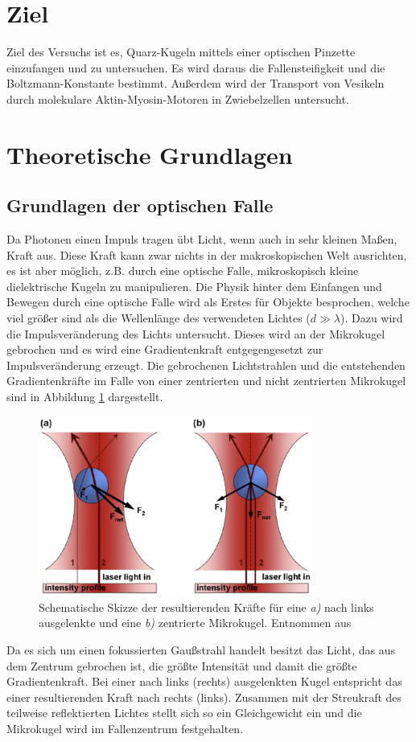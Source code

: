 \section{Ziel}
  Ziel des Versuchs ist es, Quarz-Kugeln mittels einer optischen Pinzette einzufangen und zu untersuchen. Es wird daraus die Fallensteifigkeit und die Boltzmann-Konstante bestimmt. Außerdem wird der Transport von Vesikeln durch molekulare Aktin-Myosin-Motoren in Zwiebelzellen untersucht.
\section{Theoretische Grundlagen}
  \subsection{Grundlagen der optischen Falle}
    Da Photonen einen Impuls tragen übt Licht, wenn auch in sehr kleinen Maßen, Kraft aus. Diese Kraft kann zwar nichts in der makroskopischen Welt ausrichten, es ist aber möglich, z.B. durch eine optische Falle, mikroskopisch kleine dielektrische Kugeln zu manipulieren. \cite{ashkin}
    Die Physik hinter dem Einfangen und Bewegen durch eine optische Falle wird als Erstes für Objekte besprochen, welche viel größer sind als die Wellenlänge des verwendeten Lichtes ($d\gg\lambda$).
    Dazu wird die Impulsveränderung des Lichts untersucht. Dieses wird an der Mikrokugel gebrochen und es wird eine Gradientenkraft entgegengesetzt zur Impulsveränderung erzeugt. Die gebrochenen Lichtstrahlen und die entstehenden Gradientenkräfte im Falle von einer zentrierten und nicht zentrierten Mikrokugel sind in Abbildung \ref{fig:Falle} dargestellt.
    \begin{figure}[h]
      \centering
      \includegraphics[width = 0.8\textwidth]{pictures/Falle.png}
      \caption{Schematische Skizze der resultierenden Kräfte für eine \textit{a)} nach links ausgelenkte und eine \textit{b)} zentrierte Mikrokugel. Entnommen aus \cite{tu_dortmund_versuchsanleitung_OptischePinzette}}
      \label{fig:Falle}
    \end{figure}
    Da es sich um einen fokussierten Gaußstrahl handelt besitzt das Licht, das aus dem Zentrum gebrochen ist, die größte Intensität und damit die größte Gradientenkraft. Bei einer nach links (rechts) ausgelenkten Kugel entspricht das einer resultierenden Kraft nach rechts (links). Zusammen mit der Streukraft des teilweise reflektierten Lichtes stellt sich so ein Gleichgewicht ein und die Mikrokugel wird im Fallenzentrum festgehalten.

